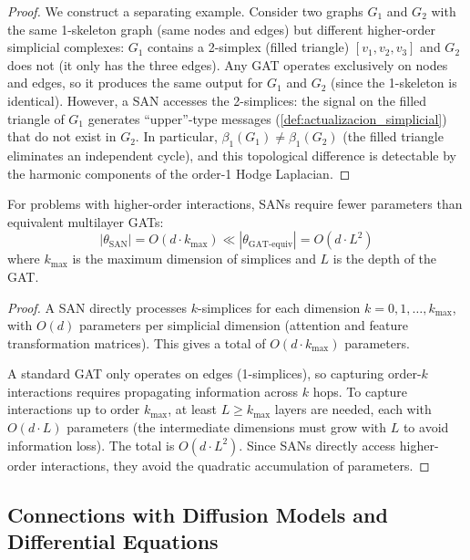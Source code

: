 \begin{proof}
We construct a separating example. Consider two graphs $G_1$ and $G_2$ with the same 1-skeleton graph (same nodes and edges) but different higher-order simplicial complexes: $G_1$ contains a 2-simplex (filled triangle) $[v_1, v_2, v_3]$ and $G_2$ does not (it only has the three edges). Any \gls{GAT} operates exclusively on nodes and edges, so it produces the same output for $G_1$ and $G_2$ (since the 1-skeleton is identical). However, a SAN accesses the 2-simplices: the signal on the filled triangle of $G_1$ generates ``upper''-type messages (\autoref{def:actualizacion_simplicial}) that do not exist in $G_2$. In particular, $\beta_1(G_1) \neq \beta_1(G_2)$ (the filled triangle eliminates an independent cycle), and this topological difference is detectable by the harmonic components of the order-1 Hodge Laplacian.
\end{proof}

\begin{corollary}\label{cor:ventaja_computacional_sans}
For problems with higher-order interactions, SANs require fewer parameters than equivalent multilayer \glspl{GAT}:
\begin{equation}
    |\theta_{\text{SAN}}| = O(d \cdot k_{\max}) \ll |\theta_{\text{GAT-equiv}}| = O(d \cdot L^2)
\end{equation}
where $k_{\max}$ is the maximum dimension of simplices and $L$ is the depth of the \gls{GAT}.
\end{corollary}

\begin{proof}
A SAN directly processes $k$-simplices for each dimension $k = 0, 1, \ldots, k_{\max}$, with $O(d)$ parameters per simplicial dimension (attention and feature transformation matrices). This gives a total of $O(d \cdot k_{\max})$ parameters.

A standard \gls{GAT} only operates on edges (1-simplices), so capturing order-$k$ interactions requires propagating information across $k$ hops. To capture interactions up to order $k_{\max}$, at least $L \geq k_{\max}$ layers are needed, each with $O(d \cdot L)$ parameters (the intermediate dimensions must grow with $L$ to avoid information loss). The total is $O(d \cdot L^2)$. Since SANs directly access higher-order interactions, they avoid the quadratic accumulation of parameters.
\end{proof}

\subsection{Connections with Diffusion Models and Differential Equations}

